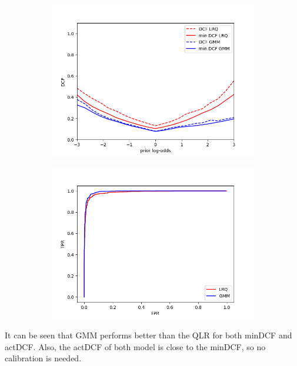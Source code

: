 \documentclass[english]{report}
\begin{document}
\begin{figure}[h!]
    \begin{subfigure}{0.5\textwidth}
        \includegraphics[scale=0.5]{../../images/comparison/validation/DCF_LRQ&GMM}
    \end{subfigure}
    \begin{subfigure}{0.5\textwidth}
        \includegraphics[scale=0.5]{../../images/comparison/validation/ROC_LRQ&GMM}
    \end{subfigure}
    \label{fig:MVGvsGMM}
\end{figure}
It can be seen that GMM performs better than the QLR for both minDCF and actDCF.
Also, the actDCF of both model is close to the minDCF, so no calibration is needed.
\end{document}
